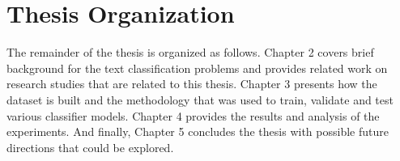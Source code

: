 \section{Thesis Organization} \label{intro:organization}
The remainder of the thesis is organized as follows. Chapter 2 covers brief background for the text classification problems and provides related work on research studies that are related to this thesis. Chapter 3 presents how the dataset is built and the methodology that was used to train, validate and test various classifier models. Chapter 4  provides the results and analysis of the experiments. And finally, Chapter 5 concludes the thesis with possible future directions that could be explored.